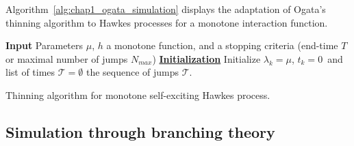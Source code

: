 Algorithm~\ref{alg:chap1_ogata_simulation} displays the adaptation of Ogata's thinning algorithm to Hawkes processes for a monotone interaction function.

\begin{algorithm}[!ht]
    \SetAlgoLined
     \textbf{Input} Parameters $\mu$, $h$ a monotone function, and a stopping criteria (end-time $T$ or maximal number of jumps $N_{max}$)\;
     \textbf{\underline{Initialization}} Initialize $\lambda_k =\mu$, $t_k=0$\ and list of times $\mathcal{T} = \emptyset$\;
     \Return the sequence of jumps $\mathcal{T}$.
     \caption{Thinning algorithm for monotone self-exciting Hawkes process.}
     \label{alg:chap1_ogata_simulation}
\end{algorithm}

\subsection{Simulation through branching theory}


